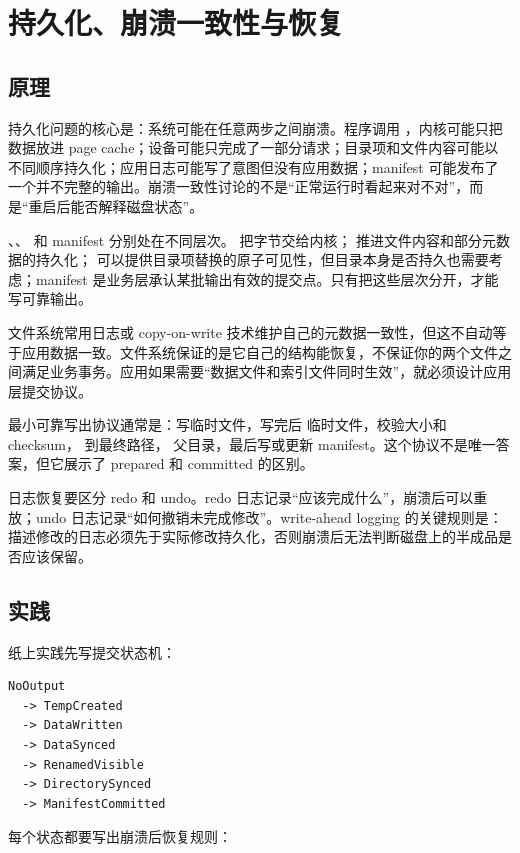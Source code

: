 \chapter{持久化、崩溃一致性与恢复}

\section{原理}

持久化问题的核心是：系统可能在任意两步之间崩溃。程序调用 ，内核可能只把数据放进 page cache；设备可能只完成了一部分请求；目录项和文件内容可能以不同顺序持久化；应用日志可能写了意图但没有应用数据；manifest 可能发布了一个并不完整的输出。崩溃一致性讨论的不是“正常运行时看起来对不对”，而是“重启后能否解释磁盘状态”。

、、 和 manifest 分别处在不同层次。 把字节交给内核； 推进文件内容和部分元数据的持久化； 可以提供目录项替换的原子可见性，但目录本身是否持久也需要考虑；manifest 是业务层承认某批输出有效的提交点。只有把这些层次分开，才能写可靠输出。

文件系统常用日志或 copy-on-write 技术维护自己的元数据一致性，但这不自动等于应用数据一致。文件系统保证的是它自己的结构能恢复，不保证你的两个文件之间满足业务事务。应用如果需要“数据文件和索引文件同时生效”，就必须设计应用层提交协议。

最小可靠写出协议通常是：写临时文件，写完后  临时文件，校验大小和 checksum， 到最终路径， 父目录，最后写或更新 manifest。这个协议不是唯一答案，但它展示了 prepared 和 committed 的区别。

日志恢复要区分 redo 和 undo。redo 日志记录“应该完成什么”，崩溃后可以重放；undo 日志记录“如何撤销未完成修改”。write-ahead logging 的关键规则是：描述修改的日志必须先于实际修改持久化，否则崩溃后无法判断磁盘上的半成品是否应该保留。

\section{实践}

纸上实践先写提交状态机：

\begin{lstlisting}
NoOutput
  -> TempCreated
  -> DataWritten
  -> DataSynced
  -> RenamedVisible
  -> DirectorySynced
  -> ManifestCommitted
\end{lstlisting}

每个状态都要写出崩溃后恢复规则：

